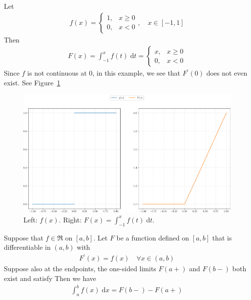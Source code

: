 \documentclass[thmcnt=section, 12pt]{my-elegantbook}
\begin{document}
\begin{example} \label{eg:12}
	Let 
	\begin{align*}
		f(x) = \begin{cases}
			1,
			&x \geq 0 \\ 
			0,
			&x < 0 
		\end{cases},
		\quad x \in [-1, 1]
	\end{align*}
	Then 
	\begin{align*}
		F(x)
		= \int_{-1}^x f(t) \; \mathrm{d} t
		= \begin{cases}
			x,
			&x \geq 0 \\ 
			0, 
			&x < 0 
		\end{cases}
	\end{align*}
	Since $f$ is not continuous at $0$, in this example,
	we see that $F^\prime(0)$ does not even exist. 
	See Figure~\ref{fig:15}
	\begin{figure}[ht]
		\centering
		\includegraphics[scale=0.5]{figures/ma-015.png}
		\caption{Left: $f(x)$. Right: $F(x) = \int_{-1}^x f(t) \; \mathrm{d} t$.}
		\label{fig:15}
	\end{figure}
\end{example}


\begin{theorem} \label{thm:82}
	Suppose that $f \in \mathfrak{R}$ on $[a, b]$.
	Let $F$ be a function defined on $[a, b]$ 
	that is differentiable in $(a, b)$
	with 
	\begin{align*}
		F^\prime(x) = f(x)
		\quad \forall x \in (a, b)
	\end{align*}
	Suppose also at the endpoints, the one-sided limits 
	$F(a+)$ and $F(b-)$ both exist and satisfy
	Then we have 
	\begin{align}
		\int_a^b f(x) \; \mathrm{d} x
		= F(b-) - F(a+)
		\label{eq:144}
	\end{align}
\end{theorem}
\end{document}
